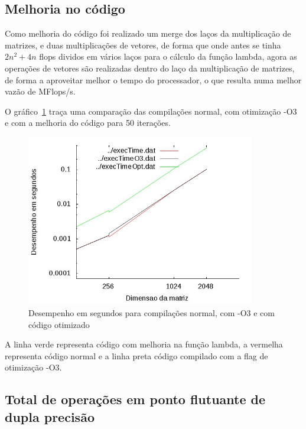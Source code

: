 \documentclass[12pt]{article}
\begin{document}
\clearpage

\subsection{Melhoria no código}\label{sec:melhoria}

Como melhoria do código foi realizado um merge dos laços da multiplicação de
matrizes, e duas multiplicações de vetores, de forma que onde antes se tinha
$2n^2 + 4n$ flops dividos em vários laços para o cálculo da função lambda,
agora as operações de vetores são realizadas dentro do laço da multiplicação de
matrizes, de forma a aproveitar melhor o tempo do processador, o que resulta
numa melhor vazão de MFlops/s.

O gráfico~\ref{fig:compExec} traça uma comparação das compilações normal, com
otimização -O3 e com a melhoria do código para 50 iterações.

\begin{figure}[htb] \begin{center}
\includegraphics[width=100mm]{img/compExec.jpg} \end{center}
\caption{Desempenho em segundos para compilações normal, com -O3 e com código
otimizado}\label{fig:compExec} \end{figure}

A linha verde representa código com melhoria na função lambda, a vermelha
representa código normal e a linha preta código compilado com a flag de
otimização -O3.

\clearpage

\subsection{Total de operações em ponto flutuante de dupla precisão}\label{sec:flopOp}
\end{document}
